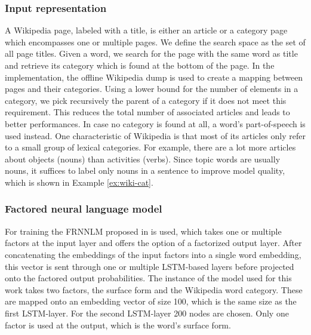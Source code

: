 \documentclass[a4paper]{article}
\begin{document}
\subsubsection{Input representation}
A Wikipedia page, labeled with a title, is either an article or a category page which encompasses one or multiple pages.
We define the search space as the set of all page titles. Given a word, we search for the page with the same word as title and retrieve its category which is found at the bottom of the page.
In the implementation, the offline Wikipedia dump is used to create a mapping between pages and their categories. Using a lower bound for the number of elements in a category, we pick recursively the parent of a category if it does not meet this requirement. This reduces the total number of associated articles and leads to better performances. In case no category is found at all, a word's part-of-speech is used instead.
One characteristic of Wikipedia is that most of its articles only refer to a small group of lexical categories. For example, there are a lot more articles about objects (nouns) than activities (verbs). Since topic words are usually nouns, it suffices to label only nouns in a sentence to improve model quality, which is shown in Example \ref{ex:wiki-cat}.

\subsubsection{Factored neural language model}
For training the FRNNLM proposed in \cite{niehuesusing} is used, which takes one or multiple factors at the input layer and offers the option of a factorized output layer. After concatenating the embeddings of the input factors into a single word embedding, this vector is sent through one or multiple LSTM-based layers \cite{hochreiter1997long} before projected onto the factored output probabilities. The instance of the model used for this work takes two factors, the surface form and the Wikipedia word category. These are mapped onto an embedding vector of size 100, which is the same size as the first LSTM-layer. For the second LSTM-layer 200 nodes are chosen. Only one factor is used at the output, which is the word's surface form.
\end{document}
